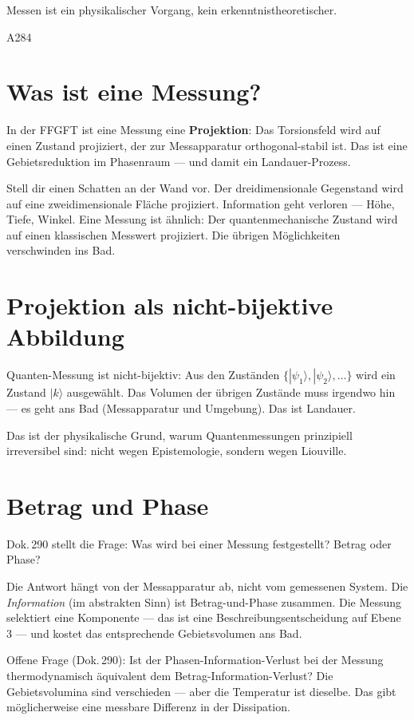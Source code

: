 \label{ch:messung}

\epigraph{Messen ist ein physikalischer Vorgang, kein erkenntnistheoretischer.}{A284}

\section{Was ist eine Messung?}

In der FFGFT ist eine Messung eine \textbf{Projektion}: Das Torsionsfeld
wird auf einen Zustand projiziert, der zur Messapparatur orthogonal-stabil
ist. Das ist eine Gebietsreduktion im Phasenraum --- und damit ein
Landauer-Prozess. 

\begin{laierspur}
Stell dir einen Schatten an der Wand vor. Der dreidimensionale Gegenstand
wird auf eine zweidimensionale Fläche projiziert. Information geht verloren ---
Höhe, Tiefe, Winkel. Eine Messung ist ähnlich: Der quantenmechanische
Zustand wird auf einen klassischen Messwert projiziert. Die übrigen
Möglichkeiten verschwinden ins Bad.
\end{laierspur}

\section{Projektion als nicht-bijektive Abbildung}

Quanten-Messung ist nicht-bijektiv: Aus den Zuständen
$\{|\psi_1\rangle, |\psi_2\rangle, \ldots\}$ wird ein Zustand $|k\rangle$
ausgewählt. Das Volumen der übrigen Zustände muss irgendwo hin ---
es geht ans Bad (Messapparatur und Umgebung). Das ist Landauer. 

Das ist der physikalische Grund, warum Quantenmessungen prinzipiell
irreversibel sind: nicht wegen Epistemologie, sondern wegen Liouville.

\section{Betrag und Phase}

Dok.\,290 stellt die Frage: Was wird bei einer Messung festgestellt?
Betrag oder Phase?

Die Antwort hängt von der Messapparatur ab, nicht vom gemessenen System.
Die \emph{Information} (im abstrakten Sinn) ist Betrag-und-Phase zusammen.
Die Messung selektiert eine Komponente --- das ist eine
Beschreibungsentscheidung auf Ebene 3 --- und kostet das entsprechende
Gebietsvolumen ans Bad.

Offene Frage  (Dok.\,290): Ist der Phasen-Information-Verlust
bei der Messung thermodynamisch äquivalent dem Betrag-Information-Verlust?
Die Gebietsvolumina sind verschieden --- aber die Temperatur ist dieselbe.
Das gibt möglicherweise eine messbare Differenz in der Dissipation.
